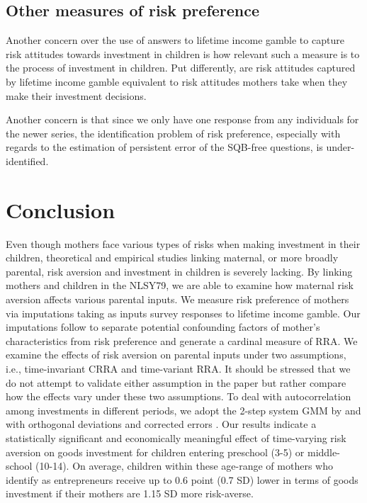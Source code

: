 \documentclass[emulatestandardclasses, 10pt, abstract = true]{scrartcl}
\begin{document}
\subsection{Other measures of risk preference}

Another concern over the use of answers to lifetime income gamble to capture risk attitudes towards investment in children is how relevant such a measure is to the process of investment in children. Put differently, are risk attitudes captured by lifetime income gamble equivalent to risk attitudes mothers take when they make their investment decisions.  



Another concern is that since we only have one response from any individuals for the newer series, the identification problem of risk preference, especially with regards to the estimation of persistent error of the SQB-free questions, is under-identified. 




\section{Conclusion}
Even though mothers face various types of risks when making investment in their children, theoretical and empirical studies linking maternal, or more broadly parental, risk aversion and investment in children is severely lacking. By linking mothers and children in the NLSY79, we are able to examine how maternal risk aversion affects various parental inputs. We measure risk preference of mothers via imputations taking as inputs survey responses to lifetime income gamble. Our imputations follow \citet{kimball2008imputing,kimball2009risk} to separate potential confounding factors of mother's characteristics from risk preference and generate a cardinal measure of RRA. We examine the effects of risk aversion on parental inputs under two assumptions, i.e., time-invariant CRRA and time-variant RRA. It should be stressed that we do not attempt to validate either assumption in the paper but rather compare how the effects vary under these two assumptions. To deal with autocorrelation among investments in different periods, we adopt the 2-step system GMM by \citet{arellano1991some} and \citet{blundell1998initial} with orthogonal deviations \citep{arellano1995another} and corrected errors \citep{windmeijer2005finite}. Our results indicate a statistically significant and economically meaningful effect of time-varying risk aversion on goods investment for children entering preschool (3-5) or middle-school (10-14). On average, children within these age-range of mothers who identify as entrepreneurs receive up to 0.6 point (0.7 SD) lower in terms of goods investment if their mothers are 1.15 SD more risk-averse. 
\end{document}
